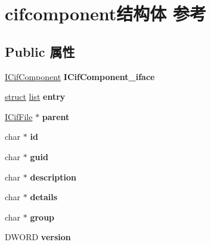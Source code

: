 \hypertarget{structcifcomponent}{}\section{cifcomponent结构体 参考}
\label{structcifcomponent}
\subsection*{Public 属性}
\begin{DoxyCompactItemize}
\item 
\mbox{\label{structcifcomponent_aa822e0a5c2dc33c5c7dfe798eef2d9c8}} 
\hyperlink{interface_i_cif_component}{I\+Cif\+Component} {\bfseries I\+Cif\+Component\+\_\+iface}
\item 
\mbox{\label{structcifcomponent_a6c09d0742811cac50eb43db8776603e3}} 
\hyperlink{interfacestruct}{struct} \hyperlink{classlist}{list} {\bfseries entry}
\item 
\mbox{\label{structcifcomponent_a6d6b39b6d96767086f6841af09f41dd7}} 
\hyperlink{interface_i_cif_file}{I\+Cif\+File} $\ast$ {\bfseries parent}
\item 
\mbox{\label{structcifcomponent_a0581077776c95b6659636e1b1424768a}} 
char $\ast$ {\bfseries id}
\item 
\mbox{\label{structcifcomponent_a7d812efbbd13d47e2235fed0fc8c6be4}} 
char $\ast$ {\bfseries guid}
\item 
\mbox{\label{structcifcomponent_a2d4ed8ce28750823591f4ab9b4940533}} 
char $\ast$ {\bfseries description}
\item 
\mbox{\label{structcifcomponent_a5c4d33c30f8d48cd175de57d6d8b9918}} 
char $\ast$ {\bfseries details}
\item 
\mbox{\label{structcifcomponent_a087d790fadc6375846dbb5705c8e1673}} 
char $\ast$ {\bfseries group}
\item 
\mbox{\label{structcifcomponent_aa6b9630bba4fbb4791f1c52d3779c9d3}} 
D\+W\+O\+RD {\bfseries version}

\end{DoxyCompactItemize}
